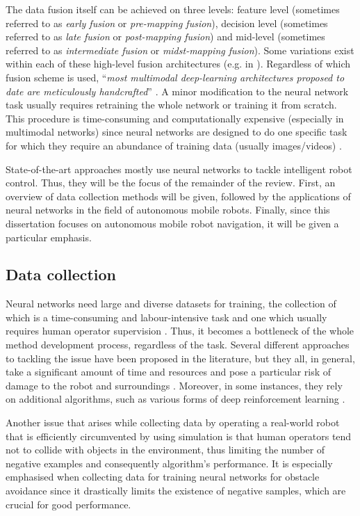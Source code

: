The data fusion itself can be achieved on three levels\cite{Ramachandram2017,Toprak2017}: feature level (sometimes referred to as \emph{early fusion} or \emph{pre-mapping fusion}), decision level (sometimes referred to as \emph{late fusion} or \emph{post-mapping fusion}) and mid-level (sometimes referred to as \emph{intermediate fusion} or \emph{midst-mapping fusion}). Some variations exist within each of these high-level fusion architectures (e.g. in \cite{Chou2018}). Regardless of which fusion scheme is used, ``\emph{most multimodal deep-learning architectures proposed to date are meticulously handcrafted}'' \cite{Ramachandram2017}. A minor modification to the neural network task usually requires retraining the whole network or training it from scratch. This procedure is time-consuming and computationally expensive (especially in multimodal networks) since neural networks are designed to do one specific task for which they require an abundance of training data (usually images/videos) \cite{Ahmad2005}.

State-of-the-art approaches mostly use neural networks to tackle intelligent robot control. Thus, they will be the focus of the remainder of the review. First, an overview of data collection methods will be given, followed by the applications of neural networks in the field of autonomous mobile robots. Finally, since this dissertation focuses on autonomous mobile robot navigation, it will be given a particular emphasis.

\subsection{Data collection}

Neural networks need large and diverse datasets for training, the collection of which is a time-consuming and labour-intensive task and one which usually requires human operator supervision \cite{Giusti2016,Gandhi2017,Pinto2016}. Thus, it becomes a bottleneck of the whole method development process, regardless of the task. Several different approaches to tackling the issue have been proposed in the literature, but they all, in general, take a significant amount of time and resources and pose a particular risk of damage to the robot and surroundings \cite{Gandhi2017,Pinto2016}. Moreover, in some instances, they rely on additional algorithms, such as various forms of deep reinforcement learning \cite{Mnih2015,Xie2017}.

Another issue that arises while collecting data by operating a real-world robot that is efficiently circumvented by using simulation is that human operators tend not to collide with objects in the environment, thus limiting the number of negative examples and consequently algorithm's performance. It is especially emphasised when collecting data for training neural networks for obstacle avoidance since it drastically limits the existence of negative samples, which are crucial for good performance.

